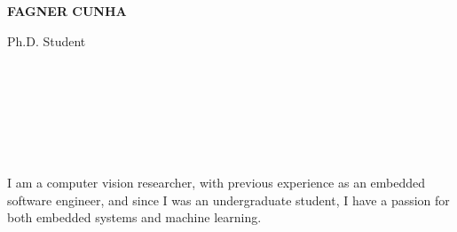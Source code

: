 \documentclass[10pt]{developercv} %
\begin{document}
\begin{minipage}[t]{0.6\textwidth}
  \vspace{-\baselineskip} %

  {\HUGE\textbf{\MakeUppercase{Fagner Cunha}}}
  \vspace{5pt}

  {\huge Ph.D. Student} %

  \\

\end{minipage}
\begin{minipage}[t]{0.3\textwidth}
  \vspace{-\baselineskip} %

  \\
 \\
\\ \\
\end{minipage}



\begin{minipage}[t]{\textwidth}

I am a computer vision researcher, with previous experience as an embedded 
software engineer, and since I was an undergraduate student, I have a passion 
for both embedded systems and machine learning.
\end{minipage}


\end{document}
